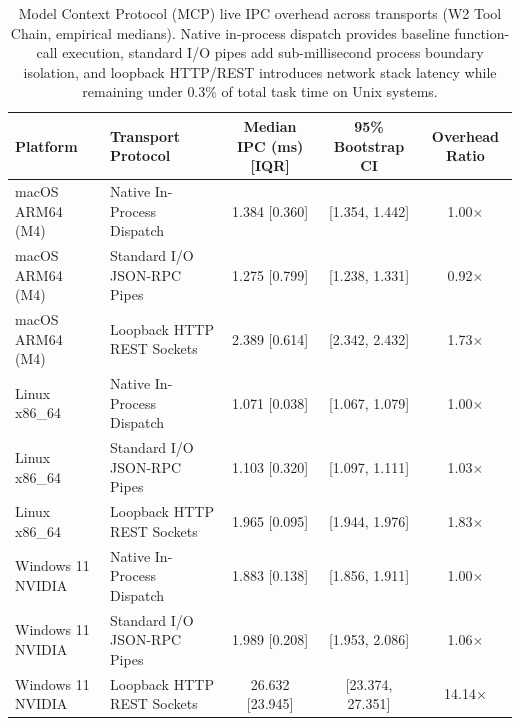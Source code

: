 \begin{table}[t]
\centering
\small
\caption{Model Context Protocol (MCP) live IPC overhead across transports (W2 Tool Chain, empirical medians). Native in-process dispatch provides baseline function-call execution, standard I/O pipes add sub-millisecond process boundary isolation, and loopback HTTP/REST introduces network stack latency while remaining under $0.3\%$ of total task time on Unix systems.}
\label{tab:mcp_transport_ablation}
\begin{tabular}{llccc}
\toprule
\textbf{Platform} & \textbf{Transport Protocol} & \textbf{Median IPC (ms) [IQR]} & \textbf{95\% Bootstrap CI} & \textbf{Overhead Ratio} \\
\midrule
macOS ARM64 (M4) & Native In-Process Dispatch & 1.384 [0.360] & [1.354, 1.442] & 1.00$\times$ \\
macOS ARM64 (M4) & Standard I/O JSON-RPC Pipes & 1.275 [0.799] & [1.238, 1.331] & 0.92$\times$ \\
macOS ARM64 (M4) & Loopback HTTP REST Sockets & 2.389 [0.614] & [2.342, 2.432] & 1.73$\times$ \\
\midrule
Linux x86\_64 & Native In-Process Dispatch & 1.071 [0.038] & [1.067, 1.079] & 1.00$\times$ \\
Linux x86\_64 & Standard I/O JSON-RPC Pipes & 1.103 [0.320] & [1.097, 1.111] & 1.03$\times$ \\
Linux x86\_64 & Loopback HTTP REST Sockets & 1.965 [0.095] & [1.944, 1.976] & 1.83$\times$ \\
\midrule
Windows 11 NVIDIA & Native In-Process Dispatch & 1.883 [0.138] & [1.856, 1.911] & 1.00$\times$ \\
Windows 11 NVIDIA & Standard I/O JSON-RPC Pipes & 1.989 [0.208] & [1.953, 2.086] & 1.06$\times$ \\
Windows 11 NVIDIA & Loopback HTTP REST Sockets & 26.632 [23.945] & [23.374, 27.351] & 14.14$\times$ \\
\midrule
\bottomrule
\end{tabular}
\end{table}
